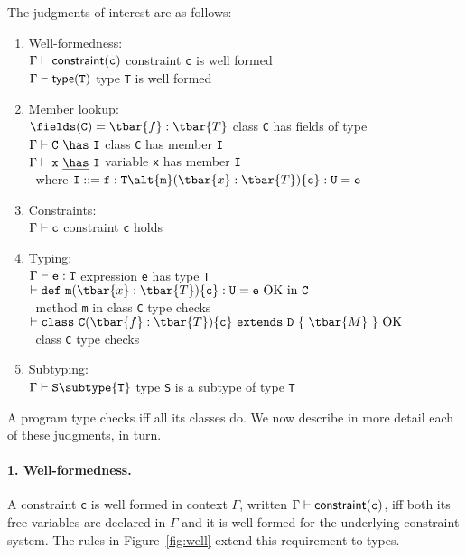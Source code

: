 The judgments of interest are as follows:
\begin{enumerate}
	\item Well-formedness:\\
	  $\cj{\Gamma}{\tt c}$ \hfill constraint {\tt c} is well formed\\
	  $\wj{\Gamma}{\tt T}$ \hfill  type {\tt T} is well formed
	\item Member lookup:\\
	  $\fields({\tt C})=\tbar{f}:\tbar{T}$ \hfill class {\tt C} has fields  of type \\
	  $\Gamma\vdash {\tt C}~\has~{\tt I}$ \hfill class {\tt C} has member {\tt I}\\
	  $\Gamma\vdash {\tt x}~\underline\has~{\tt I}$ \hfill variable {\tt x} has member {\tt I}\\
	  $~$ \hfill where ${\tt I}::= {\tt f}:{\tt T} \alt {\tt m}(\tbar{x}:\tbar{T})\{{\tt c}\}:{\tt U}={\tt e}$
	\item Constraints:\\
	  $\Gamma\vdash {\tt c}$ \hfill constraint {\tt c} holds
	\item Typing:\\
	  $\Gamma\vdash {\tt e}:{\tt T}$ \hfill expression {\tt e} has type {\tt T}\\
	  $\vdash {\tt def}~{\tt m}(\tbar{x}:\tbar{T})\{{\tt c}\}:{\tt U}={\tt e}~{\rm OK~in}~{\tt C}$ \\ $~$ \hfill method {\tt m} in class {\tt C} type checks\\
	  $\vdash {\tt class}~{\tt C}(\tbar{f}:\tbar{T})\{{\tt c}\}~{\tt extends}~{\tt D}~\{~\tbar{M}~\}~{\rm OK}$ \\ $~$ \hfill class {\tt C} type checks
	\item Subtyping:\\
	  $\Gamma \vdash {\tt S} \subtype {\tt T}$ \hfill type {\tt S} is a subtype of type {\tt T}
\end{enumerate}

\medskip

A program type checks iff all its classes do.  We now describe
in more detail each of these judgments, in turn.

\paragraph{1. Well-formedness.} A constraint {\tt c} is well
formed in context $\Gamma$, written $\cj{\Gamma}{\tt c}$, iff
both
its free variables are declared in $\Gamma$ and it is well
formed for the underlying constraint system. The rules in Figure~\ref{fig:well} extend this requirement to types.

